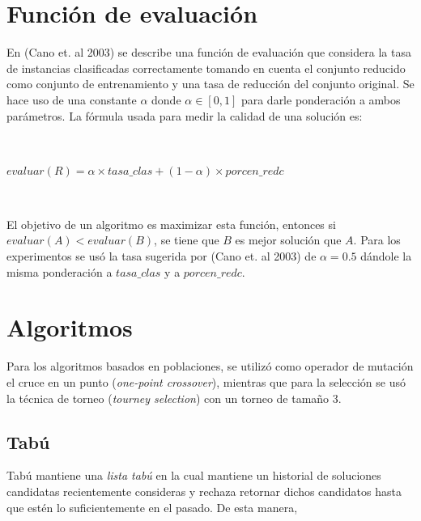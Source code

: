\documentclass[11pt]{article}
\begin{document}
\section{Función de evaluación}
En (Cano et. al 2003) se describe una función de evaluación que considera la tasa de instancias clasificadas correctamente tomando en cuenta el conjunto reducido como conjunto de entrenamiento y una tasa de reducción del conjunto original. Se hace uso de una constante $\alpha$ donde $\alpha \in [0,1]$ para darle ponderación a ambos parámetros. La fórmula usada para medir la calidad de una solución es:

~\

\begin{center}
    {\fontsize{10}{10}\selectfont
    $ evaluar(R) = \alpha \times tasa\_clas + (1 - \alpha) \times porcen\_redc $
    }
\end{center}

~\

El objetivo de un algoritmo es maximizar esta función, entonces si $evaluar(A) < evaluar(B)$, se tiene que $B$ es mejor solución que $A$. Para los experimentos se usó la tasa sugerida por (Cano et. al 2003) de $\alpha = 0.5$ dándole la misma ponderación a $tasa\_clas$ y a $porcen\_redc$.

\section{Algoritmos}

    Para los algoritmos basados en poblaciones, se utilizó como operador de mutación el cruce en un punto (\emph{one-point crossover}), mientras que para la selección se usó la técnica de torneo (\emph{tourney selection}) con un torneo de tamaño 3.

    \subsection{Tabú}
    Tabú mantiene una \emph{lista tabú} en la cual mantiene un historial de soluciones candidatas recientemente consideras 
    y rechaza retornar dichos candidatos hasta que estén lo suficientemente en el pasado. De esta manera,
\end{document}
